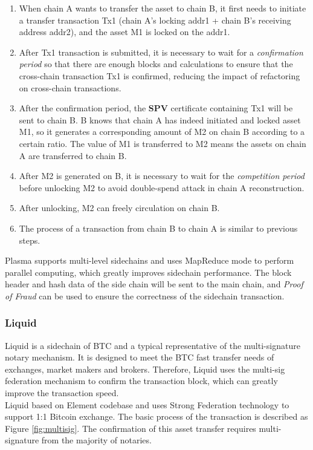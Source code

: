 \begin{enumerate}
    \item When chain A wants to transfer the asset to chain B, it first needs to initiate a transfer transaction Tx1 (chain A's locking addr1 + chain B's receiving address addr2), and the asset M1 is locked on the addr1.
    \item After Tx1 transaction is submitted, it is necessary to wait for a \textit{confirmation period} so that there are enough blocks and calculations to ensure that the cross-chain transaction Tx1 is confirmed, reducing the impact of refactoring on cross-chain transactions.
    \item After the confirmation period, the \textbf{SPV} certificate containing Tx1 will be sent to chain B. B knows that chain A has indeed initiated and locked asset M1, so it generates a corresponding amount of M2 on chain B according to a certain ratio. The value of M1 is transferred to M2 means the assets on chain A are transferred to chain B.
    \item After M2 is generated on B, it is necessary to wait for the \textit{competition period} before unlocking M2 to avoid double-spend attack in chain A reconstruction.
    \item After unlocking, M2 can freely circulation on chain B.
    \item The process of a transaction from chain B to chain A is similar to previous steps.
\end{enumerate}
\noindent Plasma supports multi-level sidechains and uses MapReduce mode to perform parallel computing, which greatly improves sidechain performance. The block header and hash data of the side chain will be sent to the main chain, and \textit{Proof of Fraud} can be used to ensure the correctness of the sidechain transaction.


\subsubsection{Liquid}
\noindent Liquid\cite{Liquid} is a sidechain of BTC and a typical representative of the multi-signature notary mechanism. It is designed to meet the BTC fast transfer needs of exchanges, market makers and brokers. Therefore, Liquid uses the multi-sig federation mechanism to confirm the transaction block, which can greatly improve the transaction speed.\\
\noindent Liquid based on Element codebase and uses Strong Federation technology to support 1:1 Bitcoin exchange. The basic process of the transaction is described as Figure \ref{fig:multisig}. The confirmation of this asset transfer requires multi-signature from the majority of notaries.

